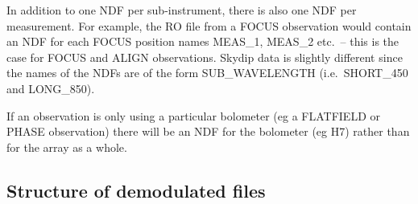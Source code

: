 \documentclass[twoside,11pt]{starlink}
\begin{document}
In addition to one NDF per sub-instrument, there is also one NDF per
measurement. For example, the RO file from a FOCUS observation would contain
an NDF for each FOCUS position names MEAS\_1, MEAS\_2 etc.\ -- this is the
case for FOCUS and ALIGN observations. Skydip data is slightly different
since the names of the NDFs are of the form SUB\_WAVELENGTH (i.e.\ SHORT\_450
and LONG\_850).

If an observation is only using a particular bolometer (eg a FLATFIELD or
PHASE observation) there will be an NDF for the bolometer (eg H7) rather than
for the array as a whole.


\subsection{Structure of demodulated files\label{demodstruc}}
\end{document}
